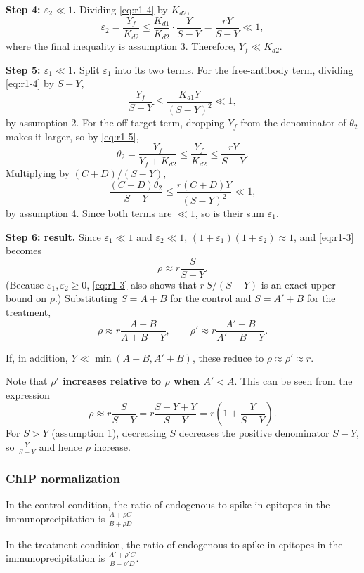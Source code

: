\documentclass[11pt]{article}
\begin{document}
\textbf{Step 4: $\varepsilon_2\ll1$.} Dividing \eqref{eq:r1-4} by $K_{d2}$,
\begin{equation}
\varepsilon_2
=\frac{Y_f}{K_{d2}}
\le\frac{K_{d1}}{K_{d2}}\cdot\frac{Y}{S-Y}
=\frac{rY}{S-Y}
\ll1,
\label{eq:r1-5}
\end{equation}
where the final inequality is assumption 3. Therefore, $Y_f\ll K_{d2}$.

\textbf{Step 5: $\varepsilon_1\ll1$.} Split $\varepsilon_1$ into its two
terms. For the free-antibody term, dividing \eqref{eq:r1-4} by $S-Y$,
$$
\frac{Y_f}{S-Y}
\le\frac{K_{d1}Y}{(S-Y)^2}
\ll1,
$$
by assumption 2. For the off-target term, dropping $Y_f$ from the
denominator of $\theta_2$ makes it larger, so by \eqref{eq:r1-5},
$$
\theta_2=\frac{Y_f}{Y_f+K_{d2}}\le\frac{Y_f}{K_{d2}}\le\frac{rY}{S-Y}.
$$
Multiplying by $(C+D)/(S-Y)$,
$$
\frac{(C+D)\theta_2}{S-Y}
\le\frac{r(C+D)Y}{(S-Y)^2}
\ll1,
$$
by assumption 4. Since both terms are $\ll1$, so is their sum
$\varepsilon_1$.

\textbf{Step 6: result.} Since $\varepsilon_1\ll1$ and $\varepsilon_2\ll1$,
$(1+\varepsilon_1)(1+\varepsilon_2)\approx1$, and \eqref{eq:r1-3} becomes
$$
\rho\approx r\frac{S}{S-Y}.
$$
(Because $\varepsilon_1,\varepsilon_2\ge0$, \eqref{eq:r1-3} also shows that
$r\,S/(S-Y)$ is an exact upper bound on $\rho$.) Substituting $S=A+B$ for
the control and $S=A'+B$ for the treatment,
$$
\rho\approx r\frac{A+B}{A+B-Y},
\qquad
\rho'\approx r\frac{A'+B}{A'+B-Y}.
$$

If, in addition, $Y\ll\min(A+B,A'+B)$, these reduce to $\rho\approx\rho'\approx r$.

Note that \textbf{$\rho'$ increases relative to $\rho$ when $A' < A$}. This can be seen from the expression
$$\rho \approx r \frac{S}{S-Y} = r \frac{S-Y+Y}{S-Y} = r \left(1 + \frac{Y}{S-Y} \right).$$
For $S>Y$ (assumption 1), decreasing $S$ decreases the positive denominator $S-Y$, so $\frac{Y}{S-Y}$ and hence $\rho$ increase.

\subsubsection{ChIP normalization}

In the control condition, the ratio of endogenous to spike-in epitopes in the immunoprecipitation is
$\frac{A + \rho C}{B + \rho D}$

In the treatment condition, the ratio of endogenous to spike-in epitopes in the immunoprecipitation is
$\frac{A' + \rho' C}{B + \rho' D}$.
\end{document}
